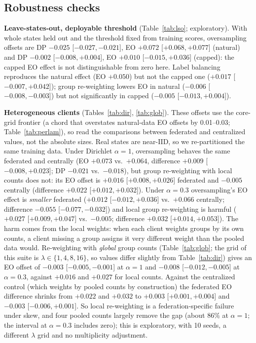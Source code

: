 
\subsection{Robustness checks}
\label{sec:robust}
\textbf{Leave-states-out, deployable threshold} (Table~\ref{tab:lso}; exploratory). With whole states held out and the threshold fixed from training scores, oversampling offsets are DP $-0.025$ [$-0.027,-0.021$], EO $+0.072$ [$+0.068,+0.077$] (natural) and DP $-0.002$ [$-0.008,+0.004$], EO $+0.010$ [$-0.015,+0.036$] (capped): the capped EO effect is not distinguishable from zero here. Label balancing reproduces the natural effect (EO $+0.050$) but not the capped one ($+0.017$ [$-0.007,+0.042$]); group re-weighting lowers EO in natural ($-0.006$ [$-0.008,-0.003$]) but not significantly in capped ($-0.005$ [$-0.013,+0.004$]).

\textbf{Heterogeneous clients} (Tables~\ref{tab:dir}, \ref{tab:glob}). These offsets use the core-grid frontier (a chord that overstates natural-data EO offsets by 0.01--0.03; Table~\ref{tab:perlam}), so read the comparisons between federated and centralized values, not the absolute sizes. Real states are near-IID, so we re-partitioned the same training data. Under Dirichlet $\alpha{=}1$, oversampling behaves the same federated and centrally (EO $+0.073$ vs.\ $+0.064$, difference $+0.009$ [$-0.008,+0.023$]; DP $-0.021$ vs.\ $-0.018$), but group re-weighting with local counts does not: its EO offset is $+0.016$ [$+0.008,+0.026$] federated and $-0.005$ centrally (difference $+0.022$ [$+0.012,+0.032$]). Under $\alpha{=}0.3$ oversampling's EO effect is \emph{smaller} federated ($+0.012$ [$-0.012,+0.036$] vs.\ $+0.066$ centrally; difference $-0.055$ [$-0.077,-0.032$]) and local group re-weighting is harmful ($+0.027$ [$+0.009,+0.047]$ vs.\ $-0.005$; difference $+0.032$ [$+0.014,+0.053$]). The harm comes from the local weights: when each client weights groups by its own counts, a client missing a group assigns it very different weight than the pooled data would. Re-weighting with \emph{global} group counts (Table~\ref{tab:glob}; the grid of this suite is $\lambda\in\{1,4,8,16\}$, so values differ slightly from Table~\ref{tab:dir}) gives an EO offset of $-0.003$ [$-0.005,-0.001$] at $\alpha{=}1$ and $-0.008$ [$-0.012,-0.005$] at $\alpha{=}0.3$, against $+0.016$ and $+0.027$ for local counts. Against the centralized control (which weights by pooled counts by construction) the federated EO difference shrinks from $+0.022$ and $+0.032$ to $+0.003$ [$+0.001,+0.004$] and $-0.003$ [$-0.006,+0.001$]. So local re-weighting is a federation-specific failure under skew, and four pooled counts largely remove the gap (about 86\% at $\alpha{=}1$; the interval at $\alpha{=}0.3$ includes zero); this is exploratory, with 10 seeds, a different $\lambda$ grid and no multiplicity adjustment.

